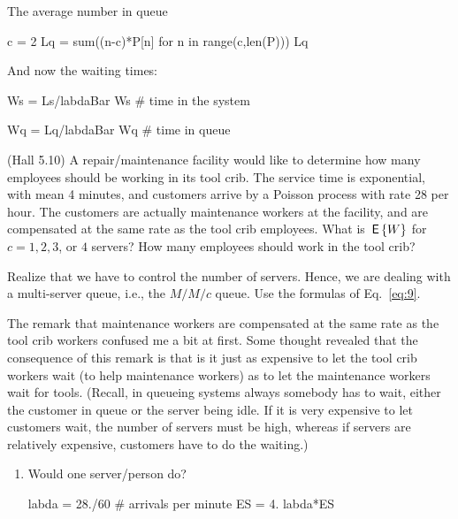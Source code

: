 \begin{exercise}
\begin{solution}
The average number in queue 
\begin{pyconsole}
c = 2
Lq = sum((n-c)*P[n] for n in range(c,len(P)))
Lq
\end{pyconsole} 

And now the waiting times:

\begin{pyconsole}
Ws = Ls/labdaBar
Ws # time in the system

Wq = Lq/labdaBar
Wq # time in queue
\end{pyconsole} 

    \end{solution}
\end{exercise}

\begin{exercise}
  (Hall 5.10) A repair/maintenance facility would like to determine
  how many employees should be working in its tool crib. The service
  time is exponential, with mean 4 minutes, and customers arrive by a
  Poisson process with rate 28 per hour. The customers are actually
  maintenance workers at the facility, and are compensated at the same
  rate as the tool crib employees.
 What is $\,\mathsf{E}\left\{W\right\}$ for $c=1, 2, 3$, or $4$ servers? How many employees should work in the tool crib?
  \begin{hint}
Realize that we have to control the number of servers. Hence,
    we are dealing with a multi-server queue, i.e., the $M/M/c$
    queue. Use the formulas of Eq.~\eqref{eq:9}.

The remark that maintenance workers are compensated at the same rate
as the tool crib workers confused me a bit at first.  Some thought
revealed that the consequence of this remark is that is it just as
expensive to let the tool crib workers wait (to help maintenance
workers) as to let the maintenance workers wait for tools. (Recall, in
queueing systems always somebody has to wait, either the customer in queue or
the server being idle. If it is very expensive to let customers wait, the number
of servers must be high, whereas if servers are relatively expensive, customers have to do the waiting.)
  \end{hint}
  \begin{solution}
    \begin{enumerate}
    \item 
      Would one server/person do? 
\begin{pyconsole}
labda = 28./60 # arrivals per minute
ES = 4.
labda*ES
\end{pyconsole} 


\end{enumerate}
\end{solution}
\end{exercise}
